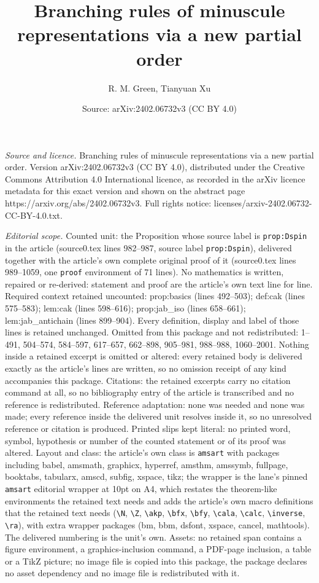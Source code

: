 \documentclass[10pt,a4paper]{amsart}
\title[Branching rules of minuscule representations via a new parti]{Branching rules of minuscule representations via a new partial order}
\author{R. M. Green, Tianyuan Xu}
\date{Source: arXiv:2402.06732v3 (CC BY 4.0)}
\begin{document}
\maketitle

\noindent\emph{Source and licence.} Branching rules of minuscule representations via a new partial order. Version arXiv:2402.06732v3 (CC BY 4.0), distributed under the Creative Commons Attribution 4.0 International licence, as recorded in the arXiv licence metadata for this exact version and shown on the abstract page https://arxiv.org/abs/2402.06732v3. Full rights notice: licenses/arxiv-2402.06732-CC-BY-4.0.txt.\par\smallskip

\noindent\textit{Editorial scope.} Counted unit: the Proposition whose source label is \texttt{prop:Dspin} in the article (source0.tex lines 982--987, source label \texttt{prop:Dspin}), delivered together with the article's own complete original proof of it (source0.tex lines 989--1059, one \texttt{proof} environment of 71 lines). No mathematics is written, repaired or re-derived: statement and proof are the article's own text line for line. Required context retained uncounted: prop:basics (lines 492--503); def:cak (lines 575--583); lem:cak (lines 598--616); prop:jab\_iso (lines 658--661); lem:jab\_antichain (lines 899--904). Every definition, display and label of those lines is retained unchanged. Omitted from this package and not redistributed: 1--491, 504--574, 584--597, 617--657, 662--898, 905--981, 988--988, 1060--2001. Nothing inside a retained excerpt is omitted or altered: every retained body is delivered exactly as the article's lines are written, so no omission receipt of any kind accompanies this package. Citations: the retained excerpts carry no citation command at all, so no bibliography entry of the article is transcribed and no reference is redistributed. Reference adaptation: none was needed and none was made; every reference inside the delivered unit resolves inside it, so no unresolved reference or citation is produced. Printed slips kept literal: no printed word, symbol, hypothesis or number of the counted statement or of its proof was altered. Layout and class: the article's own class is \texttt{amsart} with packages including babel, amsmath, graphicx, hyperref, amsthm, amssymb, fullpage, booktabs, tabularx, amscd, subfig, xspace, tikz; the wrapper is the lane's pinned \texttt{amsart} editorial wrapper at 10pt on A4, which restates the theorem-like environments the retained text needs and adds the article's own macro definitions that the retained text needs (\texttt{\textbackslash N}, \texttt{\textbackslash Z}, \texttt{\textbackslash akp}, \texttt{\textbackslash bfx}, \texttt{\textbackslash bfy}, \texttt{\textbackslash cala}, \texttt{\textbackslash calc}, \texttt{\textbackslash inverse}, \texttt{\textbackslash ra}), with extra wrapper packages (bm, bbm, dsfont, xspace, cancel, mathtools). The delivered numbering is the unit's own. Assets: no retained span contains a figure environment, a graphics-inclusion command, a PDF-page inclusion, a table or a TikZ picture; no image file is copied into this package, the package declares no asset dependency and no image file is redistributed with it. 
\end{document}
